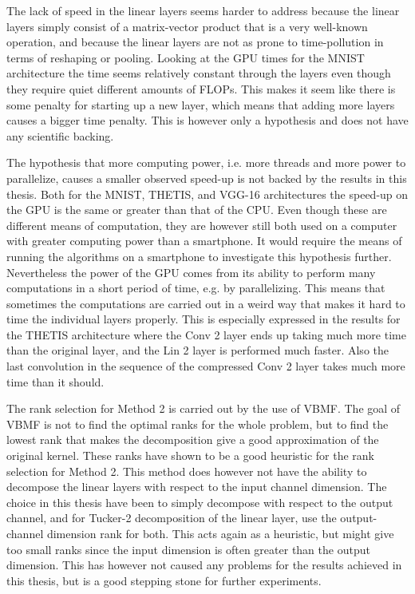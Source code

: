 The lack of speed in the linear layers seems harder to address because the linear layers simply consist of a matrix-vector product that is a very well-known operation, and because the linear layers are not as prone to time-pollution in terms of reshaping or pooling. Looking at the GPU times for the MNIST architecture the time seems relatively constant through the layers even though they require quiet different amounts of FLOPs. This makes it seem like there is some penalty for starting up a new layer, which means that adding more layers causes a bigger time penalty. This is however only a hypothesis and does not have any scientific backing.

The hypothesis that more computing power, i.e. more threads and more power to parallelize, causes a smaller observed speed-up is not backed by the results in this thesis. Both for the MNIST, THETIS, and VGG-16 architectures the speed-up on the GPU is the same or greater than that of the CPU. Even though these are different means of computation, they are however still both used on a computer with greater computing power than a smartphone. It would require the means of running the algorithms on a smartphone to investigate this hypothesis further. Nevertheless the power of the GPU comes from its ability to perform many computations in a short period of time, e.g. by parallelizing. This means that sometimes the computations are carried out in a weird way that makes it hard to time the individual layers properly. This is especially expressed in the results for the THETIS architecture where the Conv 2 layer ends up taking much more time than the original layer, and the Lin 2 layer is performed much faster. Also the last convolution in the sequence of the compressed Conv 2 layer takes much more time than it should.

The rank selection for Method 2 is carried out by the use of VBMF. The goal of VBMF is not to find the optimal ranks for the whole problem, but to find the lowest rank that makes the decomposition give a good approximation of the original kernel. These ranks have shown to be a good heuristic for the rank selection for Method 2. This method does however not have the ability to decompose the linear layers with respect to the input channel dimension. The choice in this thesis have been to simply decompose with respect to the output channel, and for Tucker-2 decomposition of the linear layer, use the output-channel dimension rank for both. This acts again as a heuristic, but might give too small ranks since the input dimension is often greater than the output dimension. This has however not caused any problems for the results achieved in this thesis, but is a good stepping stone for further experiments.


